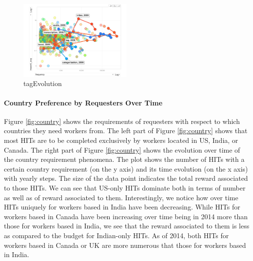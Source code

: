 \begin{figure}[htbp]
	\centering
		\includegraphics[width=0.5\textwidth]{figures/tagEvolution}
	\caption{tagEvolution}
	\label{fig:tagEvolution}
\end{figure}

\paragraph{Country Preference by Requesters Over Time}
Figure \ref{fig:country} shows the requirements of requesters with respect to which countries they need workers from. The left part of Figure \ref{fig:country} shows that most HITs are to be completed exclusively by workers located in US, India, or Canada. The right part of Figure \ref{fig:country} shows the evolution over time of the country requirement phenomena.
The plot shows the number of HITs with a certain country requirement (on the y axis) and its time evolution (on the x axis) with yearly steps. The size of the data point indicates the total reward associated to those HITs.
We can see that US-only HITs dominate both in terms of number as well as of reward associated to them. 
Interestingly, we notice how over time HITs uniquely for workers based in India have been decreasing. 
While HITs for workers based in Canada have been increasing over time being in 2014 more than those for workers based in India, we see that the reward associated to them is less as compared to the budget for Indian-only HITs.
As of 2014, both HITs for workers based in Canada or UK are more numerous that those for workers based in India.


